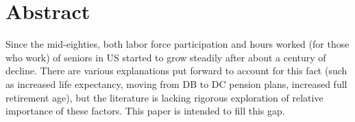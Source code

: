 \documentclass[
10pt, %
a4paper, %
oneside, %
headinclude,footinclude, %
BCOR5mm, %
]{scrartcl}
\title{\normalfont\spacedallcaps{Restless: Why Do Elders Delay Retirement?}} %
\author{\spacedlowsmallcaps{Alexey Filatov*}} %
\date{} %
\begin{document}

\renewcommand{\sectionmark}[1]{\markright{\spacedlowsmallcaps{#1}}} %
\lehead{\mbox{\llap{\small\thepage\kern1em\color{halfgray} \vline}\color{halfgray}\hspace{0.5em}\rightmark\hfil}} %

\pagestyle{scrheadings} %


\maketitle %






\section*{Abstract} %

Since the mid-eighties, both labor force participation and hours worked (for those who work) of seniors in US started to grow steadily after about a century of decline. There are various explanations put forward to account for this fact (such as increased life expectancy, moving from DB to DC pension plans, increased full retirement age), but the literature is lacking rigorous exploration of relative importance of these factors. This paper is intended to fill this gap.
\end{document}
